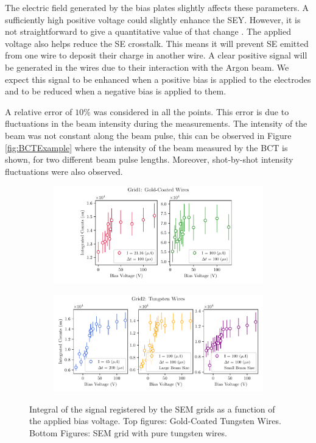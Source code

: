 The electric field generated by the bias plates slightly affects these parameters. A sufficiently high positive voltage could slightly enhance the SEY. However, it is not straightforward to give a quantitative value of that change \parencite[]{ref:VoltageOnSEY1}  \parencite[]{ref:VoltageOnSEY2}. The applied voltage also helps reduce the SE crosstalk. This means it will prevent SE emitted from one wire to deposit their charge in another wire. A clear positive signal will be generated in the wires due to their interaction with the Argon beam. We expect this signal to be enhanced when a positive bias is applied to the electrodes and to be reduced when a negative bias is applied to them.

A relative error of $10\%$ was considered in all the points. This error is due to fluctuations in the beam intensity during the measurements. The intensity of the beam was not constant along the beam pulse, this can be observed in Figure \ref{fig:BCTExample} where the intensity of the beam measured by the BCT is shown, for two different beam pulse lengths. Moreover, shot-by-shot intensity fluctuations were also observed. 

\begin{figure}[t]
    \centering
    \begin{subfigure}{1.0\columnwidth}
        \centering
        \includegraphics[width=\columnwidth]{IntensityScan/Grid1_IntensityScan.pdf}
    \end{subfigure}
    \begin{subfigure}{1.0\columnwidth}
        \centering
        \includegraphics[width=\columnwidth]{IntensityScan/Grid2_IntensityScan.pdf}
    \end{subfigure}
    
    \caption{Integral of the signal registered by the SEM grids as a function of the applied bias voltage. Top figures: Gold-Coated Tungsten Wires. Bottom Figures: SEM grid with pure tungsten wires. }
    \label{fig:BiasScan}
\end{figure}

